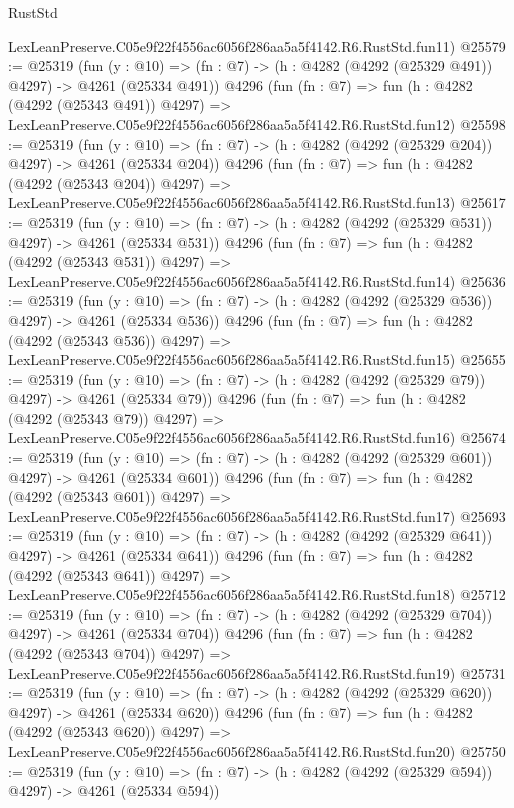 \begin{lexlean}{RustStd}
\begin{coremodule}
    LexLeanPreserve.C05e9f22f4556ac6056f286aa5a5f4142.R6.RustStd.fun11)
@25579 := @25319
    (fun (y : @10) => (fn : @7) -> (h : @4282 (@4292 (@25329 @491)) @4297) -> @4261 (@25334 @491))
    @4296
    (fun (fn : @7) =>
    fun (h : @4282 (@4292 (@25343 @491)) @4297) =>
    LexLeanPreserve.C05e9f22f4556ac6056f286aa5a5f4142.R6.RustStd.fun12)
@25598 := @25319
    (fun (y : @10) => (fn : @7) -> (h : @4282 (@4292 (@25329 @204)) @4297) -> @4261 (@25334 @204))
    @4296
    (fun (fn : @7) =>
    fun (h : @4282 (@4292 (@25343 @204)) @4297) =>
    LexLeanPreserve.C05e9f22f4556ac6056f286aa5a5f4142.R6.RustStd.fun13)
@25617 := @25319
    (fun (y : @10) => (fn : @7) -> (h : @4282 (@4292 (@25329 @531)) @4297) -> @4261 (@25334 @531))
    @4296
    (fun (fn : @7) =>
    fun (h : @4282 (@4292 (@25343 @531)) @4297) =>
    LexLeanPreserve.C05e9f22f4556ac6056f286aa5a5f4142.R6.RustStd.fun14)
@25636 := @25319
    (fun (y : @10) => (fn : @7) -> (h : @4282 (@4292 (@25329 @536)) @4297) -> @4261 (@25334 @536))
    @4296
    (fun (fn : @7) =>
    fun (h : @4282 (@4292 (@25343 @536)) @4297) =>
    LexLeanPreserve.C05e9f22f4556ac6056f286aa5a5f4142.R6.RustStd.fun15)
@25655 := @25319
    (fun (y : @10) => (fn : @7) -> (h : @4282 (@4292 (@25329 @79)) @4297) -> @4261 (@25334 @79))
    @4296
    (fun (fn : @7) =>
    fun (h : @4282 (@4292 (@25343 @79)) @4297) =>
    LexLeanPreserve.C05e9f22f4556ac6056f286aa5a5f4142.R6.RustStd.fun16)
@25674 := @25319
    (fun (y : @10) => (fn : @7) -> (h : @4282 (@4292 (@25329 @601)) @4297) -> @4261 (@25334 @601))
    @4296
    (fun (fn : @7) =>
    fun (h : @4282 (@4292 (@25343 @601)) @4297) =>
    LexLeanPreserve.C05e9f22f4556ac6056f286aa5a5f4142.R6.RustStd.fun17)
@25693 := @25319
    (fun (y : @10) => (fn : @7) -> (h : @4282 (@4292 (@25329 @641)) @4297) -> @4261 (@25334 @641))
    @4296
    (fun (fn : @7) =>
    fun (h : @4282 (@4292 (@25343 @641)) @4297) =>
    LexLeanPreserve.C05e9f22f4556ac6056f286aa5a5f4142.R6.RustStd.fun18)
@25712 := @25319
    (fun (y : @10) => (fn : @7) -> (h : @4282 (@4292 (@25329 @704)) @4297) -> @4261 (@25334 @704))
    @4296
    (fun (fn : @7) =>
    fun (h : @4282 (@4292 (@25343 @704)) @4297) =>
    LexLeanPreserve.C05e9f22f4556ac6056f286aa5a5f4142.R6.RustStd.fun19)
@25731 := @25319
    (fun (y : @10) => (fn : @7) -> (h : @4282 (@4292 (@25329 @620)) @4297) -> @4261 (@25334 @620))
    @4296
    (fun (fn : @7) =>
    fun (h : @4282 (@4292 (@25343 @620)) @4297) =>
    LexLeanPreserve.C05e9f22f4556ac6056f286aa5a5f4142.R6.RustStd.fun20)
@25750 := @25319
    (fun (y : @10) => (fn : @7) -> (h : @4282 (@4292 (@25329 @594)) @4297) -> @4261 (@25334 @594))

\end{coremodule}
\end{lexlean}
